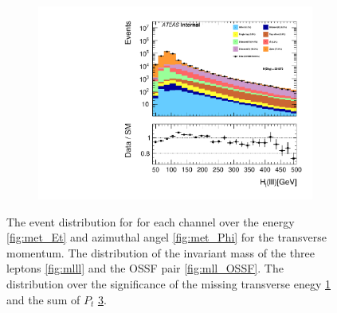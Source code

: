 \begin{figure}
{\begin{subfigure}{.425\textwidth}
        \caption{}
        \label{fig:met_Sign}
    \end{subfigure}
    \hfill
    \begin{subfigure}{.425\textwidth}
        \includegraphics[width=\textwidth]{Figures/FeaturesHistograms/Ht_lll.pdf}
        \caption{}
        \label{fig:Ht_lll}
    \end{subfigure}
    }
    \caption{The event distribution for for each channel over the energy \ref{fig:met_Et} and azimuthal
    angel \ref{fig:met_Phi} for the transverse momentum. The distribution of the invariant mass of the
    three leptons \ref{fig:mlll} and the OSSF pair \ref{fig:mll_OSSF}. The distribution over the significance
    of the missing transverse enegy \ref{fig:met_Sign} and the sum of $P_t$ \ref{fig:Ht_lll}.}
\end{figure}
\newpage
